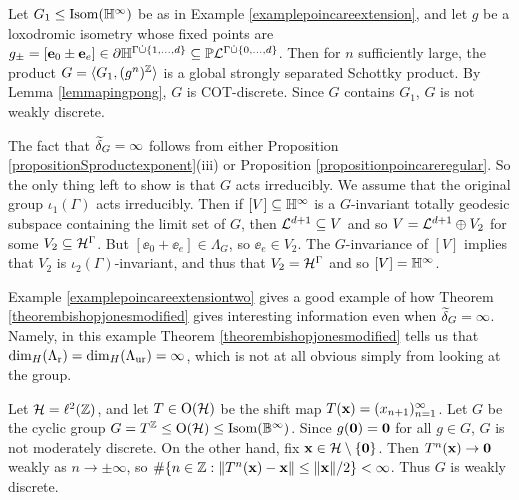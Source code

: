 \begin{example}[A nonelementary COT-discrete group $G$ which acts irreducibly on $\H^\infty$ and satisfies $\delta_G = \w\delta_G = \infty$ but which is not weakly discrete]
\label{examplepoincareextensiontwo}
Let $G_1\leq\Isom(\H^\infty)$ be as in Example \ref{examplepoincareextension}, and let $g$ be a loxodromic isometry whose fixed points are $g_\pm = [\ee_0 \pm \ee_e]\in\del\H^{\Gamma\dot\cup\{1,\ldots,d\}}\subset \proj\LL^{\Gamma\dot\cup\{0,\ldots,d\}}$. Then for $n$ sufficiently large, the product $G = \lb G_1,(g^n)^\Z\rb$ is a global strongly separated Schottky product. By Lemma \ref{lemmapingpong}, $G$ is COT-discrete. Since $G$ contains $G_1$, $G$ is not weakly discrete.

The fact that $\widetilde\delta_G = \infty$ follows from either Proposition \ref{propositionSproductexponent}(iii) or Proposition \ref{propositionpoincareregular}. So the only thing left to show is that $G$ acts irreducibly. We assume that the original group $\iota_1(\Gamma)$ acts irreducibly. Then if $[V]\subset\H^\infty$ is a $G$-invariant totally geodesic subspace containing the limit set of $G$, then $\mathcal L^{d + 1}\subseteq V$ and so $V = \mathcal L^{d + 1}\oplus V_2$ for some $V_2\subseteq \mathcal H^\Gamma$. But $[\ee_0 + \ee_e]\in\Lambda_G$, so $\ee_e\in V_2$. The $G$-invariance of $[V]$ implies that $V_2$ is $\iota_2(\Gamma)$-invariant, and thus that $V_2 = \mathcal H^\Gamma$ and so $[V] = \H^\infty$.
\end{example}
\begin{remark*}
Example \ref{examplepoincareextensiontwo} gives a good example of how Theorem \ref{theorembishopjonesmodified} gives interesting information even when $\widetilde\delta_G = \infty$. Namely, in this example Theorem \ref{theorembishopjonesmodified} tells us that ${\dim_H}(\Lambda_{\mathrm r}) = {\dim_H}(\Lambda_{\mathrm{ur}}) = \infty$, which is not at all obvious simply from looking at the group.
\end{remark*}

\begin{example}
\label{exampleMDWD}
Let $\HH = \ell^2(\Z)$, and let $T\in\operatorname{O}(\mathcal H)$ be the shift map $T(\mathbf x) = (x_{n + 1})_{n = 1}^\infty$. Let $G$ be the cyclic group $G = T^\Z\leq\O(\HH) \leq \Isom(\B^\infty)$. Since $g(\mathbf 0) = \mathbf 0$ for all $g\in G$, $G$ is not moderately discrete. On the other hand, fix $\mathbf x\in\mathcal H\setminus\{\mathbf 0\}$. Then $T^n(\mathbf x) \to \mathbf 0$ weakly as $n\to \pm \infty$, so $\#\{n\in\Z : \|T^n(\xx) - \xx\| \leq \|\xx\|/2\} < \infty$. Thus $G$ is weakly discrete.
\end{example}
